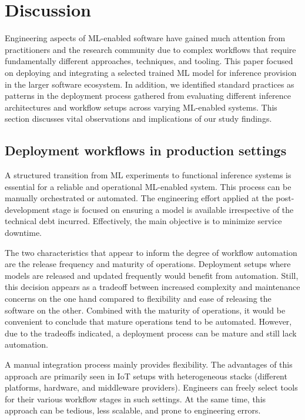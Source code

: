 \section{Discussion}
\label{sec: discussion}
Engineering aspects of ML-enabled software have gained much attention from practitioners and the research community due to
complex workflows that require fundamentally different approaches, techniques, and tooling. This paper focused on deploying and integrating a selected trained ML model for inference provision in the larger software ecosystem. In addition, we identified standard practices as patterns in the deployment process gathered from evaluating different inference architectures and workflow setups across varying ML-enabled systems. This section discusses vital observations and implications of our study findings.


\subsection{Deployment workflows in production settings}
 
A structured transition from ML experiments to functional inference systems is essential for a reliable and operational ML-enabled system. This process can be manually orchestrated or automated. The engineering effort applied at the post-development stage is focused on ensuring a model is available irrespective of the technical debt incurred. Effectively, the main objective is to minimize service downtime.

The two characteristics that appear to inform the degree of workflow automation are the release frequency and maturity of operations. Deployment setups where models are released and updated frequently would benefit from automation. Still, this decision appears as a tradeoff between increased complexity and maintenance concerns on the one hand compared to flexibility and ease of releasing the software on the other. Combined with the maturity of operations, it would be convenient to conclude that mature operations tend to be automated. However, due to the tradeoffs indicated, a deployment process can be mature and still lack automation.

A manual integration process mainly provides flexibility. The advantages of this approach are primarily seen in IoT setups with heterogeneous stacks (different platforms, hardware, and middleware providers). Engineers can freely select tools for their various workflow stages in such settings. At the same time, this approach can be tedious, less scalable, and prone to engineering errors.

